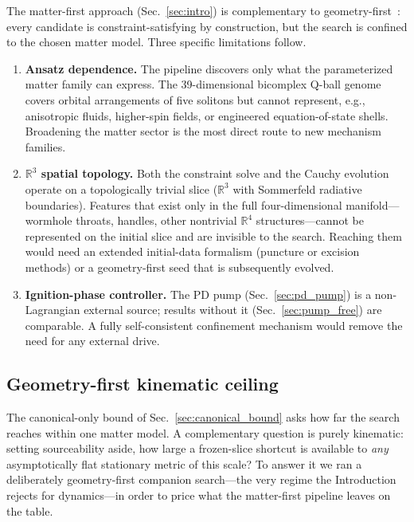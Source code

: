 \documentclass[twocolumn,floatfix,aps,prd,nofootinbib]{revtex4-2}
\begin{document}
The matter-first approach (Sec.~\ref{sec:intro}) is complementary to
geometry-first~\cite{helmerich2024warpfactory}: every candidate is
constraint-satisfying by construction, but the search is confined to the
chosen matter model. Three specific limitations follow.
\begin{enumerate}
  \item \textbf{Ansatz dependence.} The pipeline discovers only what the
    parameterized matter family can express. The 39-dimensional bicomplex
    Q-ball genome covers orbital arrangements of five solitons but cannot
    represent, e.g., anisotropic fluids, higher-spin fields, or engineered
    equation-of-state shells. Broadening the matter sector is the most direct
    route to new mechanism families.
  \item \textbf{$\mathbb{R}^3$ spatial topology.} Both the constraint solve
    and the Cauchy evolution operate on a topologically trivial slice
    ($\mathbb{R}^3$ with Sommerfeld radiative boundaries). Features that exist
    only in the full four-dimensional manifold---wormhole throats, handles,
    other nontrivial $\mathbb{R}^4$ structures---cannot be represented on the
    initial slice and are invisible to the search. Reaching them would need an
    extended initial-data formalism (puncture or excision methods) or a
    geometry-first seed that is subsequently evolved.
  \item \textbf{Ignition-phase controller.} The PD pump
    (Sec.~\ref{sec:pd_pump}) is a non-Lagrangian external source; results
    without it (Sec.~\ref{sec:pump_free}) are comparable. A fully
    self-consistent confinement mechanism would remove the need for any
    external drive.
\end{enumerate}

\subsection{Geometry-first kinematic ceiling}
\label{sec:geometry_ceiling}

The canonical-only bound of Sec.~\ref{sec:canonical_bound} asks how far the
search reaches within one matter model. A complementary question is purely
kinematic: setting sourceability aside, how large a frozen-slice shortcut is
available to \emph{any} asymptotically flat stationary metric of this scale?
To answer it we ran a deliberately geometry-first companion search---the very
regime the Introduction rejects for dynamics---in order to price what the
matter-first pipeline leaves on the table.
\end{document}
